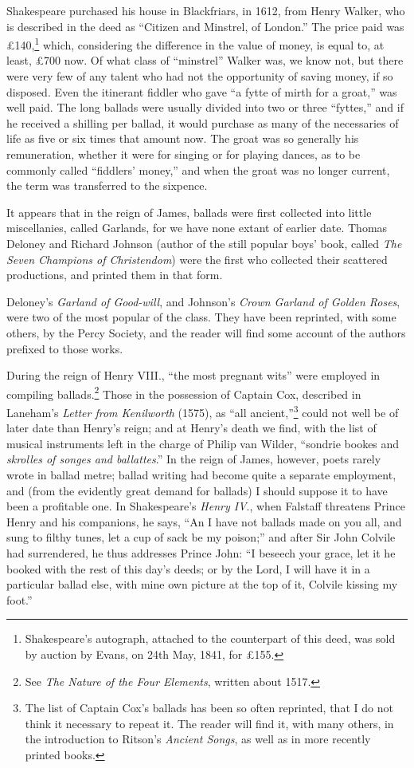 Shakespeare purchased his house in Blackfriars, in 1612, from Henry Walker,
who is described in the deed as “Citizen and Minstrel, of London.” The price
paid was £140,\footnote{\textit{}
Shakespeare’s autograph, attached to the counterpart
of this deed, was sold by auction by Evans, on 24th May,
1841, for £155.}
which, considering the difference in the value of money, is equal
to, at least, £700 now. Of what class of “minstrel” Walker was, we know not,
but there were very few of any talent who had not the opportunity of saving money,
if so disposed. Even the itinerant fiddler who gave “a fytte of mirth for a groat,”
was well paid. The long ballads were usually divided into two or three “fyttes,”
and if he received a shilling per ballad, it would purchase as many of the necessaries
of life as five or six times that amount now. The groat was so generally his
remuneration, whether it were for singing or for playing dances, as to be
commonly called “fiddlers’ money,” and when the groat was no longer current,
the term was transferred to the sixpence.

It appears that in the reign of James, ballads were first collected into little
miscellanies, called Garlands, for we have none extant of earlier date. Thomas
Deloney and Richard Johnson (author of the still popular boys’ book, called \textit{The
Seven Champions of Christendom}) were the first who collected their scattered productions, 
and printed them in that form.

Deloney’s \textit{Garland of Good-will}, and Johnson’s \textit{Crown Garland of Golden Roses},
were two of the most popular of the class. They have been reprinted, with some
others, by the Percy Society, and the reader will find some account of the authors
prefixed to those works.

During the reign of Henry VIII., “the most pregnant wits” were employed
in compiling ballads.\footnote{\textit{}
See \textit{The Nature of the Four Elements}, written about
1517.}
Those in the possession of Captain Cox, described in
Laneham’s \textit{Letter from Kenilworth} (1575), as “all ancient,”\footnote{\textit{}
The list of Captain Cox’s ballads has been so often reprinted,
that I do not think it necessary to repeat it. The
reader will find it, with many others, in the introduction
to Ritson’s \textit{Ancient Songs}, as well as in more recently printed
books.}
could not well be
of later date than Henry’s reign; and at Henry’s death we find, with the list of
musical instruments left in the charge of Philip van Wilder, “sondrie bookes and
\textit{skrolles of songes and ballattes}.” In the reign of James, however, poets rarely
wrote in ballad metre; ballad writing had become quite a separate employment,
and (from the evidently great demand for ballads) I should suppose it to have
been a profitable one. In Shakespeare’s \textit{Henry IV}., when Falstaff threatens
Prince Henry and his companions, he says, “An I have not ballads made on you
all, and sung to filthy tunes, let a cup of sack be my poison;” and after Sir
John Colvile had surrendered, he thus addresses Prince John: “I beseech your
grace, let it he booked with the rest of this day’s deeds; or by the Lord, I will
have it in a particular ballad else, with mine own picture at the top of it, Colvile
kissing my foot.”

